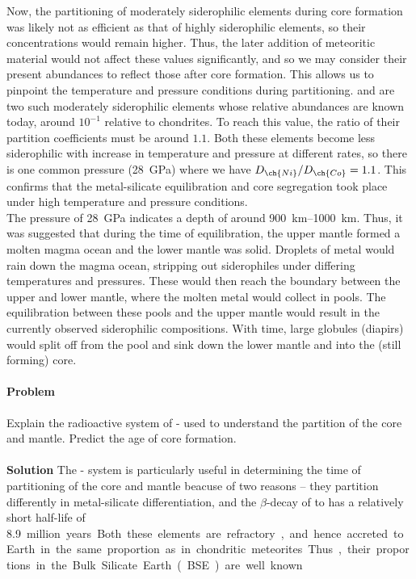 \documentclass[10pt]{article}
\newcounter{prob}
\def\problem{\stepcounter{prob}\paragraph{Problem \arabic{prob}}}
\def\solution{\\\\\textbf{Solution }}
\begin{document}
        Now, the partitioning of moderately siderophilic elements during core formation was likely not as efficient as that of highly siderophilic
        elements, so their concentrations would remain higher. Thus, the later addition of meteoritic material would not affect these values
        significantly, and so we may consider their present abundances to reflect those after core formation. This allows us to pinpoint
        the temperature and pressure conditions during partitioning.  and  are two such moderately siderophilic elements whose
        relative abundances are known today, around $10^{-1}$ relative to chondrites. To reach this value, the ratio of their partition
        coefficients must be around $1.1$. Both these elements become less siderophilic with increase in temperature and pressure at different rates,
        so there is one common pressure (\SI{28}{\giga\pascal}) where we have $D_{\ch{Ni}} / D_{\ch{Co}} = 1.1$. This confirms that
        the metal-silicate equilibration and core segregation took place under high temperature and pressure conditions. \\

        The pressure of \SI{28}{\giga\pascal} indicates a depth of around \SIrange{900}{1000}{\km}. Thus, it was suggested that during the time
        of equilibration, the upper mantle formed a molten magma ocean and the lower mantle was solid. Droplets of metal would
        rain down the magma ocean, stripping out siderophiles under differing temperatures and pressures. These would then reach the boundary
        between the upper and lower mantle, where the molten metal would collect in pools. The equilibration between these pools and the upper
        mantle would result in the currently observed siderophilic compositions. With time, large globules (diapirs) would split off from the pool
        and sink down the lower mantle and into the (still forming) core.

        \clearpage
        \problem Explain the radioactive system of - used to understand the partition of the core and mantle.
        Predict the age of core formation. 
        \solution The - system is particularly useful in determining the time of partitioning of the core and mantle beacuse
        of two reasons -- they partition differently in metal-silicate differentiation, and the $\beta$-decay of  to 
        has a relatively short half-life of \SI{8.9} million years. Both these elements are refractory, and hence accreted to Earth in the same
        proportion as in chondritic meteorites. Thus, their proportions in the Bulk Silicate Earth (BSE) are well known. \\
\end{document}
